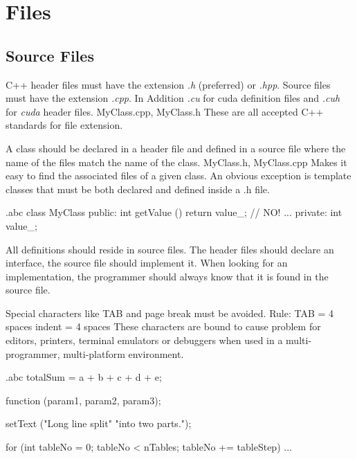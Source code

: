 \section{Files}
\subsection{Source Files}

\recommendation
{C++ header files must have the extension \textit{.h} (preferred) or \textit{.hpp}. Source files must have the extension \textit{.cpp}. In Addition \textit{.cu} for cuda definition files and \textit{.cuh} for \textit{cuda} header files.}
{MyClass.cpp, MyClass.h}
{These are all accepted C++ standards for file extension.}

\recommendation
{A class should be declared in a header file and defined in a source file where the name of the files match the name of the class.}
{MyClass.h, MyClass.cpp}
{Makes it easy to find the associated files of a given class. An obvious exception is template classes that must be both declared and defined inside a .h file.}


\begin{filecontents*}{\jobname.abc}
	class MyClass
	{
		public:
		int getValue () {return value_;}  // NO!
		...
		private:
		int value_;
	}
\end{filecontents*}

\recommendation
{All definitions should reside in source files.}
{}
{The header files should declare an interface, the source file should implement it. When looking for an implementation, the programmer should always know that it is found in the source file.}

\recommendation
{
	Special characters like TAB and page break must be avoided.\newline
	Rule: TAB = 4 spaces\newline
	indent = 4 spaces
}
{}
{These characters are bound to cause problem for editors, printers, terminal emulators or debuggers when used in a multi-programmer, multi-platform environment.}


\begin{filecontents*}{\jobname.abc}
	totalSum = a + b + c +
	d + e;
	
	function (param1, param2,
	param3);
	
	setText ("Long line split"
	"into two parts.");
	
	for (int tableNo = 0; tableNo < nTables;
	tableNo += tableStep) {
		...
	}
\end{filecontents*}

